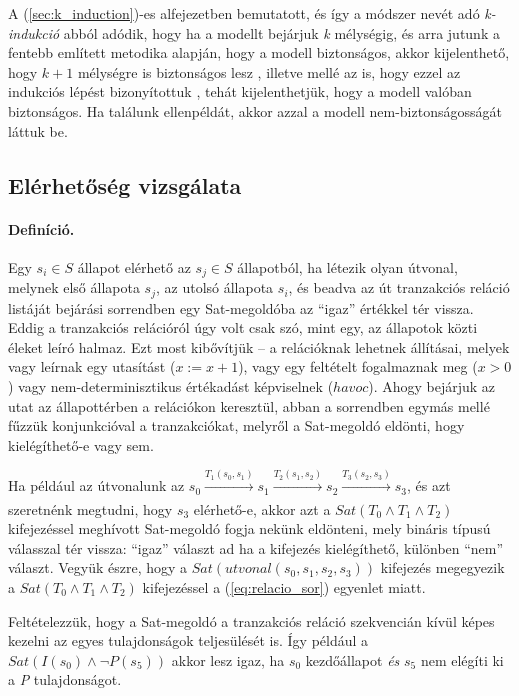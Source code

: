 \newline
\newline
A (\ref{sec:k_induction})-es alfejezetben bemutatott, és így a módszer nevét adó \emph{k-indukció} abból adódik, hogy ha a modellt bejárjuk \emph{k} mélységig, és arra jutunk a fentebb említett metodika alapján, hogy a modell biztonságos, akkor kijelenthető, hogy $k+1$ mélységre is biztonságos lesz \cite{donaldson_cikk}, illetve mellé az is, hogy ezzel az indukciós lépést bizonyítottuk \cite{k_induction_article}, tehát kijelenthetjük, hogy a modell valóban biztonságos. Ha találunk ellenpéldát, akkor azzal a modell nem-biztonságosságát láttuk be.

\subsection{Elérhetőség vizsgálata}

\paragraph{Definíció.}
Egy $s_i \in S$ állapot elérhető az $s_j \in S$ állapotból, ha létezik olyan útvonal, melynek első állapota $s_j$, az utolsó állapota $s_i$, és beadva az út tranzakciós reláció listáját bejárási sorrendben egy Sat-megoldóba az ``igaz'' értékkel tér vissza.
\newline
\newline
Eddig a tranzakciós relációról úgy volt csak szó, mint egy, az állapotok közti éleket leíró halmaz. Ezt most kibővítjük -- a relációknak lehetnek állításai, melyek vagy leírnak egy utasítást ($x := x + 1$), vagy egy feltételt fogalmaznak meg ($x > 0$) vagy nem-determinisztikus értékadást képviselnek ($\mathit{havoc}$). Ahogy bejárjuk az utat az állapottérben a relációkon keresztül, abban a sorrendben egymás mellé fűzzük konjunkcióval a tranzakciókat, melyről a Sat-megoldó eldönti, hogy kielégíthető-e vagy sem.

\begin{example}
	Ha például az útvonalunk az $s_0 \xrightarrow[\text{}]{\text{$T_1(s_0, s_1)$}} s_1 \xrightarrow[\text{}]{\text{$T_2(s_1, s_2)$}} s_2 \xrightarrow[\text{}]{\text{$T_3(s_2, s_3)$}} s_3$, és azt szeretnénk megtudni, hogy $s_3$ elérhető-e, akkor azt a $\mathit{Sat}(T_0 \wedge T_1 \wedge T_2)$ kifejezéssel meghívott Sat-megoldó fogja nekünk eldönteni, mely bináris típusú válasszal tér vissza: ``igaz'' választ ad ha a kifejezés kielégíthető, különben ``nem'' választ. Vegyük észre, hogy a $\mathit{Sat}(\mathit{utvonal}(s_0, s_1, s_2, s_3))$ kifejezés megegyezik a $\mathit{Sat}(T_0 \wedge T_1 \wedge T_2)$ kifejezéssel a (\ref{eq:relacio_sor}) egyenlet miatt.
\end{example}
Feltételezzük, hogy a Sat-megoldó a tranzakciós reláció szekvencián kívül képes kezelni az egyes tulajdonságok teljesülését is. Így például a $\mathit{Sat}(I(s_0) \wedge \neg P(s_5))$ akkor lesz igaz, ha $s_0$ kezdőállapot \emph{és} $s_5$ nem elégíti ki a \emph{P} tulajdonságot.

